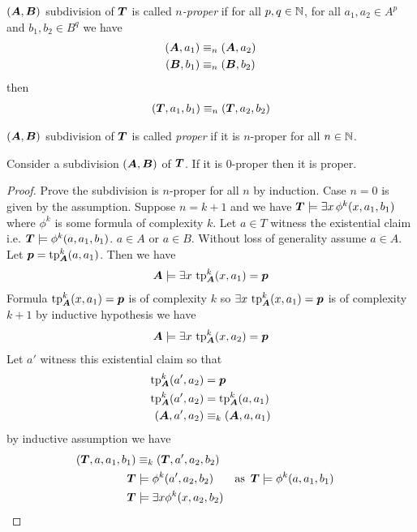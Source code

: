 \documentclass{amsart}
\DeclareMathOperator{\TT}{\boldface T}
\DeclareMathOperator{\A}{\boldface A}
\DeclareMathOperator{\B}{\boldface B}
\begin{document}
\begin{Definition}
	$(\A, \B)$ subdivision of $\TT$ is called \emph{$n$-proper} if for all $p,q \in \mathbb{N}$, for all $a_1, a_2 \in A^p$ and $b_1, b_2 \in B^q$ we have
	\begin{align*}
		(\A, a_1) &\equiv_n (\A, a_2) \\
		(\B, b_1) &\equiv_n (\B, b_2)
	\end{align*}
	then
	\begin{align*}
		(\TT, a_1, b_1) \equiv_n (\TT, a_2, b_2)
	\end{align*}
\end{Definition}

\begin{Definition}
	$(\A, \B)$ subdivision of $\TT$ is called \emph{proper} if it is $n$-proper for all $n \in \mathbb{N}$.
\end{Definition}

\begin{Lemma} \label{lm_subdivision}
	Consider a subdivision $(\A, \B)$ of $\TT$. If it is $0$-proper then it is proper.
\end{Lemma}

\begin{proof}
	Prove the subdivision is $n$-proper for all $n$ by induction. Case $n = 0$ is given by the assumption. Suppose $n = k + 1$ and we have $\TT \models \exists x \, \phi^k(x, a_1, b_1)$ where $\phi^k$ is some formula of complexity $k$. Let $a \in T$ witness the existential claim i.e. $\TT \models \phi^k(a, a_1, b_1)$. $a \in A$ or $a \in B$. Without loss of generality assume $a \in A$. Let $\pp = \tp^k_{\A} (a, a_1)$. Then we have 
	\begin{align*}
		\A \models \exists x \, \tp^k_{\A}(x, a_1) = \pp
	\end{align*}
	Formula $\tp^k_{\A}(x, a_1) = \pp$ is of complexity $k$ so $\exists x \, \tp^k_{\A}(x, a_1) = \pp$ is of complexity $k+1$ by inductive hypothesis we have
	\begin{align*}
		\A \models \exists x \, \tp^k_{\A}(x, a_2) = \pp
	\end{align*}
	Let $a'$ witness this existential claim so that  
	\begin{align*}
		\tp^k_{\A}(a', a_2) &= \pp \\
		\tp^k_{\A}(a', a_2) &= \tp^k_{\A}(a, a_1) \\
		(\A, a', a_2) &\equiv_k (\A, a, a_1)
	\end{align*}
	by inductive assumption we have
	\begin{align*}
		(\TT, a, a_1, b_1) &\equiv_k (\TT, a', a_2, b_2) \\
		\TT &\models \phi^k(a', a_2, b_2) & \text {as } \TT &\models \phi^k(a, a_1, b_1)\\
		\TT &\models \exists x \phi^k(x, a_2, b_2)
	\end{align*}
\end{proof}
\end{document}
